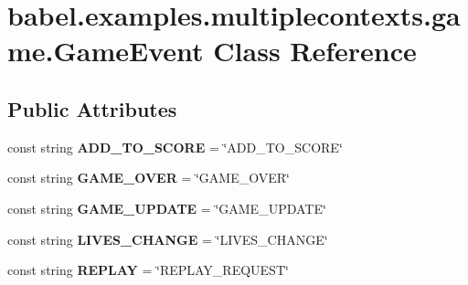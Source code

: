 \hypertarget{classbabel_1_1examples_1_1multiplecontexts_1_1game_1_1_game_event}{\section{babel.\-examples.\-multiplecontexts.\-game.\-Game\-Event Class Reference}
\label{classbabel_1_1examples_1_1multiplecontexts_1_1game_1_1_game_event}
}
\subsection*{Public Attributes}
\begin{DoxyCompactItemize}
\item 
\hypertarget{classbabel_1_1examples_1_1multiplecontexts_1_1game_1_1_game_event_a7ce173398d9bf2ba9b23d89925fe611a}{const string {\bfseries A\-D\-D\-\_\-\-T\-O\-\_\-\-S\-C\-O\-R\-E} = \char`\"{}A\-D\-D\-\_\-\-T\-O\-\_\-\-S\-C\-O\-R\-E\char`\"{}}\label{classbabel_1_1examples_1_1multiplecontexts_1_1game_1_1_game_event_a7ce173398d9bf2ba9b23d89925fe611a}

\item 
\hypertarget{classbabel_1_1examples_1_1multiplecontexts_1_1game_1_1_game_event_a5f84dc8a5ebc96c32cde1bd7f1c1077f}{const string {\bfseries G\-A\-M\-E\-\_\-\-O\-V\-E\-R} = \char`\"{}G\-A\-M\-E\-\_\-\-O\-V\-E\-R\char`\"{}}\label{classbabel_1_1examples_1_1multiplecontexts_1_1game_1_1_game_event_a5f84dc8a5ebc96c32cde1bd7f1c1077f}

\item 
\hypertarget{classbabel_1_1examples_1_1multiplecontexts_1_1game_1_1_game_event_a930302a30e31f2ef6744d60aa3d9f760}{const string {\bfseries G\-A\-M\-E\-\_\-\-U\-P\-D\-A\-T\-E} = \char`\"{}G\-A\-M\-E\-\_\-\-U\-P\-D\-A\-T\-E\char`\"{}}\label{classbabel_1_1examples_1_1multiplecontexts_1_1game_1_1_game_event_a930302a30e31f2ef6744d60aa3d9f760}

\item 
\hypertarget{classbabel_1_1examples_1_1multiplecontexts_1_1game_1_1_game_event_a4bb75ca19708f400cf0644b576fd1d73}{const string {\bfseries L\-I\-V\-E\-S\-\_\-\-C\-H\-A\-N\-G\-E} = \char`\"{}L\-I\-V\-E\-S\-\_\-\-C\-H\-A\-N\-G\-E\char`\"{}}\label{classbabel_1_1examples_1_1multiplecontexts_1_1game_1_1_game_event_a4bb75ca19708f400cf0644b576fd1d73}

\item 
\hypertarget{classbabel_1_1examples_1_1multiplecontexts_1_1game_1_1_game_event_a38793c4dfddcef400a8a42bf4f5c4395}{const string {\bfseries R\-E\-P\-L\-A\-Y} = \char`\"{}R\-E\-P\-L\-A\-Y\-\_\-\-R\-E\-Q\-U\-E\-S\-T\char`\"{}}\label{classbabel_1_1examples_1_1multiplecontexts_1_1game_1_1_game_event_a38793c4dfddcef400a8a42bf4f5c4395}


\end{DoxyCompactItemize}
